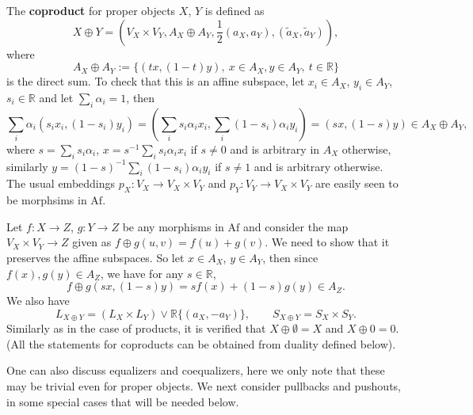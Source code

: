 \documentclass[12pt]{article}
\theoremstyle{definition}
\theoremstyle{remark}
\def \Af{\mathrm{Af}}
\def\bX{ X}
\def\bY{ Y}
\def\bZ{Z}
\begin{document}
The \textbf{coproduct} for proper objects $X$, $Y$ is defined as 
\[
\bX\oplus \bY=(V_\bX\times V_\bY, A_\bX\oplus A_\bY,\frac12(a_X,a_Y), (\tilde a_X,\tilde
a_Y)),
\]
where 
\[
A_\bX\oplus A_\bY:=\{(tx,(1-t)y),\ x\in A_{\bX}, y\in A_\bY,\ t\in \mathbb R\}
\]
is the direct sum. To check that this is an affine subspace, let $x_i\in A_\bX$, $y_i\in A_\bY$, $s_i\in
\mathbb R$ and let $\sum_i\alpha_i=1$, then 
\[
\sum_i\alpha_i(s_ix_i,(1-s_i)y_i)=(\sum_is_i\alpha_ix_i,\sum_i(1-s_i)\alpha_iy_i)=(sx,(1-s)y)\in
A_\bX\oplus A_\bY,
\]
where $s=\sum_is_i\alpha_i$, $x=s^{-1}\sum_is_i\alpha_ix_i$ if $s\ne 0$ and is arbitrary
in $A_\bX$ otherwise, similarly $y=(1-s)^{-1}\sum_i(1-s_i)\alpha_iy_i$ if $s\ne 1$ and is
arbitrary otherwise. The usual embeddings  $p_\bX:V_\bX\to V_\bX\times V_\bY$ and $p_\bY:
V_{\bY}\to V_\bX\times V_\bY$ are easily seen to be morphsims in $\Af$.   

Let  $f:\bX\to \bZ$, $g:\bY\to \bZ$ be any morphisms in $\Af$ and consider the map
$V_\bX\times V_\bY\to \bZ$ given as
$f\oplus g(u,v)=f(u)+g(v)$. We need to show that it preserves the affine subspaces. So let 
$x\in A_\bX$, $y\in  A_\bY$, then since $f(x),g(y)\in A_\bZ$, we have for any $s\in \mathbb R$,
\[
f\oplus g(sx,(1-s)y)=sf(x)+(1-s)g(y)\in A_\bZ.
\]
We also have
\[
L_{X\oplus Y}= (L_X\times L_Y)\vee \mathbb R\{(a_X,-a_Y)\},\qquad S_{X\oplus Y}=S_X\times
S_Y.
\]
Similarly as in the case of products, it is verified that $X\oplus \emptyset=X$ and
$X\oplus 0=0$. (All the statements for coproducts can be obtained from duality defined
below).


One can also discuss equalizers and coequalizers, here we only note that these may be
trivial even for proper objects. We next consider pullbacks and pushouts, in some special
cases that will be needed below.
\end{document}
